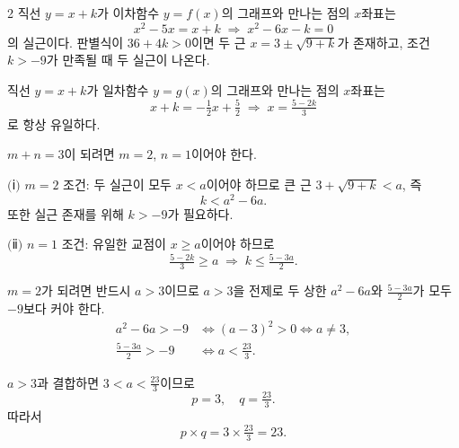 \documentclass[10pt]{article}
\begin{document}
\begin{multicols}{2}
직선 $y = x + k$가 이차함수 $y = f(x)$의 그래프와 만나는 점의 $x$좌표는
\[ x^2 - 5x = x + k \;\Rightarrow\; x^2 - 6x - k = 0 \]
의 실근이다. 판별식이 $36 + 4k > 0$이면 두 근 $x = 3 \pm \sqrt{9 + k}$가 존재하고, 조건 $k > -9$가 만족될 때 두 실근이 나온다.

직선 $y = x + k$가 일차함수 $y = g(x)$의 그래프와 만나는 점의 $x$좌표는
\[ x + k = -\tfrac{1}{2} x + \tfrac{5}{2} \;\Rightarrow\; x = \tfrac{5 - 2k}{3} \]
로 항상 유일하다.

$m + n = 3$이 되려면 $m = 2$, $n = 1$이어야 한다.

$(\!$ⅰ$)$ $m = 2$ 조건: 두 실근이 모두 $x < a$이어야 하므로 큰 근 $3 + \sqrt{9 + k} < a$, 즉
\[ k < a^2 - 6a. \]
또한 실근 존재를 위해 $k > -9$가 필요하다.

$(\!$ⅱ$)$ $n = 1$ 조건: 유일한 교점이 $x \ge a$이어야 하므로
\[ \tfrac{5 - 2k}{3} \ge a \;\Rightarrow\; k \le \tfrac{5 - 3a}{2}. \]

$m = 2$가 되려면 반드시 $a > 3$이므로 $a > 3$을 전제로 두 상한 $a^2 - 6a$와 $\tfrac{5 - 3a}{2}$가 모두 $-9$보다 커야 한다.
\begin{align*}
a^2 - 6a > -9 &\iff (a - 3)^2 > 0 \iff a \ne 3, \\
\tfrac{5 - 3a}{2} > -9 &\iff a < \tfrac{23}{3}.
\end{align*}

$a > 3$과 결합하면 $3 < a < \tfrac{23}{3}$이므로
\[ p = 3,\quad q = \tfrac{23}{3}. \]
따라서
\[ p \times q = 3 \times \tfrac{23}{3} = 23. \]


\end{multicols}
\end{document}
